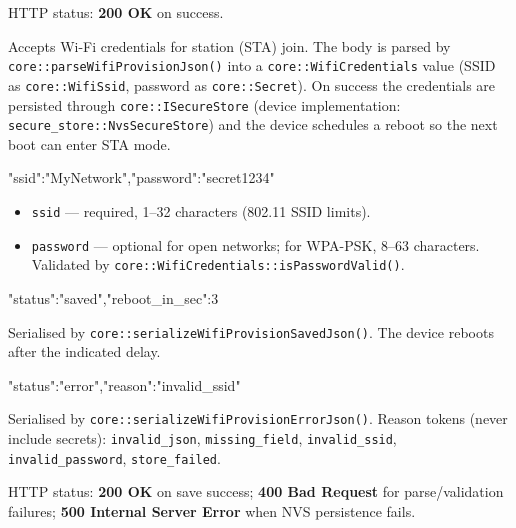 HTTP status: \textbf{200 OK} on success.

\label{sec:api-wifi}

Accepts Wi-Fi credentials for station (STA) join. The body is parsed by
\texttt{core::parseWifiProvisionJson()} into a \texttt{core::WifiCredentials}
value (SSID as \texttt{core::WifiSsid}, password as \texttt{core::Secret}).
On success the credentials are persisted through
\texttt{core::ISecureStore} (device implementation:
\texttt{secure\_store::NvsSecureStore}) and the device schedules a reboot
so the next boot can enter STA mode.

\begin{drnote}
\begin{drcode}[JSON]
{"ssid":"MyNetwork","password":"secret1234"}
\end{drcode}
\begin{itemize}
  \item \texttt{ssid} --- required, 1--32 characters (802.11 SSID limits).
  \item \texttt{password} --- optional for open networks; for WPA-PSK,
        8--63 characters. Validated by
        \texttt{core::WifiCredentials::isPasswordValid()}.
\end{itemize}
\end{drnote}

\begin{drnote}
\begin{drcode}[JSON]
{"status":"saved","reboot_in_sec":3}
\end{drcode}
Serialised by \texttt{core::serializeWifiProvisionSavedJson()}. The device
reboots after the indicated delay.
\end{drnote}

\begin{drnote}
\begin{drcode}[JSON]
{"status":"error","reason":"invalid_ssid"}
\end{drcode}
Serialised by \texttt{core::serializeWifiProvisionErrorJson()}. Reason tokens (never include secrets):
\texttt{invalid\_json}, \texttt{missing\_field}, \texttt{invalid\_ssid},
\texttt{invalid\_password}, \texttt{store\_failed}.
\end{drnote}

HTTP status: \textbf{200 OK} on save success; \textbf{400 Bad Request} for
parse/validation failures; \textbf{500 Internal Server Error} when NVS
persistence fails.

\label{sec:api-wifi-scan}

